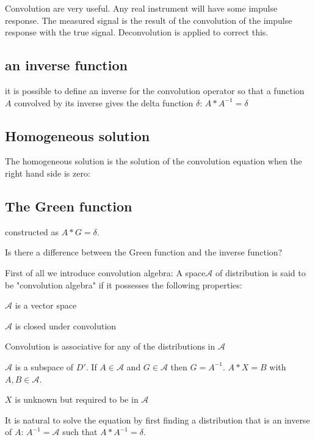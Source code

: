 \documentclass[11pt, openright]{book}
\begin{document}
Convolution are very useful. Any real instrument will have some impulse response. The measured signal is the result of the convolution of the impulse response with the true signal. Deconvolution is applied to correct this. \\

\subsection{an inverse function}
it is possible to define an inverse for the convolution operator so that a function $A$ convolved by its inverse gives the delta function $\delta$: $A*A^{-1}=\delta$

\subsection{Homogeneous solution}
The homogeneous solution is the solution of the convolution equation when the right hand side is zero:

\subsection{The Green function}
constructed as $A*G=\delta$.

Is there a difference between the Green function and the inverse function?

First of all we introduce convolution algebra: A space$\mathcal{A}$ of distribution is said to be "convolution algebra" if it possesses the following properties:
\begin{items}{-15pt}{-15pt}
    \item $\mathcal{A}$ is a vector space
    \item $\mathcal{A}$ is closed under convolution
    \item Convolution is associative for any of the distributions in $\mathcal{A}$
\end{items}

$\mathcal{A}$ is a subspace of $D'$. If $A \in \mathcal{A}$ and $G \in \mathcal{A}$ then $ G=A^{-1}$. $A*X=B$ with $A,B\in \mathcal{A}$.

$X$ is unknown but required to be in $\mathcal{A}$

It is natural to solve the equation by first finding a distribution that is an inverse of $A$: $A^{-1}=\mathcal{A}$ such that $A*A^{-1}=\delta$.\\
\end{document}
